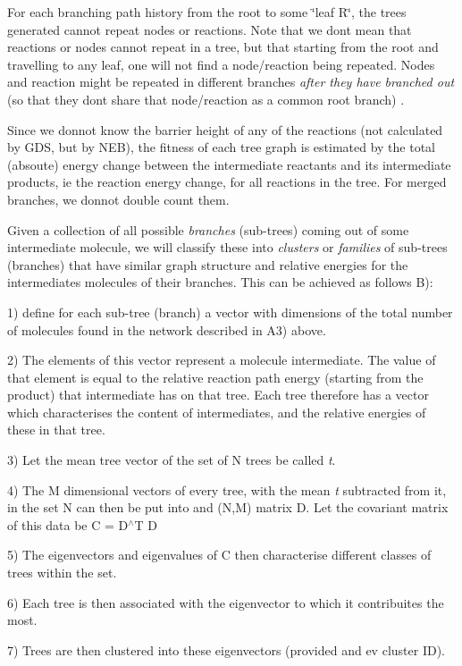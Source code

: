 For each branching path history from the root to some \char`\"{}leaf R\char`\"{}, the trees generated cannot repeat nodes or reactions. Note that we dont mean that reactions or nodes cannot repeat in a tree, but that starting from the root and travelling to any leaf, one will not find a node/reaction being repeated. Nodes and reaction might be repeated in different branches {\itshape after they have branched out} (so that they dont share that node/reaction as a common root branch) .

Since we donnot know the barrier height of any of the reactions (not calculated by G\+DS, but by N\+EB), the fitness of each tree graph is estimated by the total (absoute) energy change between the intermediate reactants and its intermediate products, ie the reaction energy change, for all reactions in the tree. For merged branches, we donnot double count them.

Given a collection of all possible {\itshape branches} (sub-\/trees) coming out of some intermediate molecule, we will classify these into {\itshape clusters} or {\itshape families} of sub-\/trees (branches) that have similar graph structure and relative energies for the intermediates molecules of their branches. This can be achieved as follows B)\+:
\begin{DoxyItemize}
\item 1) define for each sub-\/tree (branch) a vector with dimensions of the total number of molecules found in the network described in A3) above.
\item 2) The elements of this vector represent a molecule intermediate. The value of that element is equal to the relative reaction path energy (starting from the product) that intermediate has on that tree. Each tree therefore has a vector which characterises the content of intermediates, and the relative energies of these in that tree.
\item 3) Let the mean tree vector of the set of N trees be called {\itshape t}.
\item 4) The M dimensional vectors of every tree, with the mean {\itshape t} subtracted from it, in the set N can then be put into and (N,M) matrix D. Let the covariant matrix of this data be C = D$^\wedge$T D
\item 5) The eigenvectors and eigenvalues of C then characterise different classes of trees within the set.
\item 6) Each tree is then associated with the eigenvector to which it contribuites the most.
\item 7) Trees are then clustered into these eigenvectors (provided and ev cluster ID).
\end{DoxyItemize}

